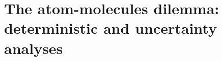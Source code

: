 \documentclass[a4paper,twoside,10pt,final]{memoir} %
\begin{document}
%
%
%
%
%
%
\clearemptydoublepage
\chapter{The atom-molecules dilemma: deterministic and uncertainty analyses} 
\label{chap:atom_mol}

\clearpage


%

%
%
%
\end{document}
